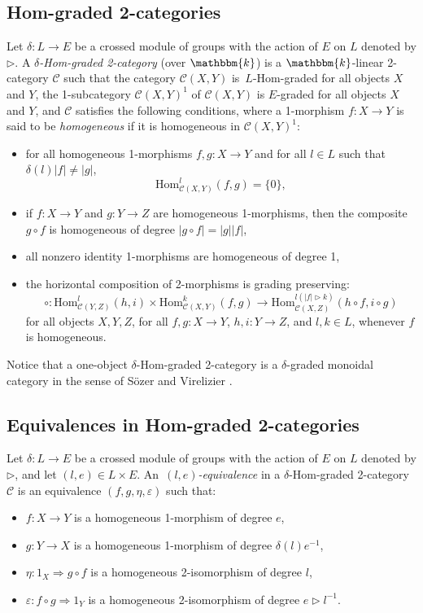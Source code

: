 \documentclass[a4paper, oneside]{amsart}
\numberwithin{equation}{subsection}
\theoremstyle{referencedlemma}
\theoremstyle{plain} %
\theoremstyle{remark}
\begin{document}
\subsection{Hom-graded 2-categories}
Let $\delta \colon L \to E$ be a crossed module of groups with the action of $E$ on $L$ denoted by $\triangleright$.  A \emph{$\delta$-Hom-graded 2-category} (over $\mathbbm{k}$) is a $\mathbbm{k}$-linear 2-category $\mathcal{C}$ such that the category $\mathcal{C}(X,Y)$ is~$L$-Hom-graded for all objects $X$ and $Y$,  the 1-subcategory $\mathcal{C}(X,Y)^1$ of $\mathcal{C}(X,Y)$ is $E$-graded for all objects $X$ and $Y$, and $\mathcal{C}$ satisfies the following conditions, where a 1-morphism $f\colon X\to Y$ is said to be \emph{homogeneous} if it is homogeneous in $\mathcal{C}(X,Y)^1$:
\begin{itemize}
\item for all homogeneous 1-morphisms $f, g\colon X\to Y$ and for all $l\in L$ such that $\delta(l)\lvert f \rvert \neq \lvert g \rvert$,
$$
\mathrm{Hom}_{\mathcal{C}(X,Y)}^l(f,g) = \{0\},
$$
\item  if $f\colon X \to Y$ and $g\colon Y\to Z$ are homogeneous 1-morphisms, then the composite $g\circ f$ is homogeneous of degree $\lvert g\circ f\rvert =  \lvert g \rvert \lvert f\rvert$,
\item all nonzero identity 1-morphisms are homogeneous of degree 1,
\item the horizontal composition of 2-morphisms is grading preserving: $$
    \circ \colon \mathrm{Hom}_{\mathcal{C}(Y,Z)}^l(h,i) \times \mathrm{Hom}_{\mathcal{C}(X,Y)}^k(f,g) \to \mathrm{Hom}_{\mathcal{C}(X,Z)}^{l(\lvert f \rvert \triangleright k)}(h\circ f, i\circ g)
$$
for all objects $X, Y,Z$, for all $f,g\colon X\to Y$, $h,i\colon Y\to Z$, and $l,k\in L$, whenever $f$ is homogeneous.
\end{itemize}

Notice that a one-object $\delta$-Hom-graded 2-category is a $\delta$-graded monoidal category in the sense of Sözer and Virelizier \cite{sozer_monoidal_2023}.

\subsection{Equivalences in Hom-graded 2-categories}

Let $\delta \colon L \to E$ be a crossed module of groups with the action of $E$ on $L$ denoted by $\triangleright$, and let $(l,e) \in L\times E$. An~\emph{$(l,e)$-equivalence} in a $\delta$-Hom-graded 2-category~$\mathcal{C}$ is an equivalence $(f,g,\eta, \varepsilon)$ such that:
\begin{itemize}
\item $f\colon X\to Y$ is a homogeneous 1-morphism of degree $e$,
\item $g\colon Y\to X$ is a homogeneous 1-morphism of degree $\delta(l)e^{-1}$,
\item $\eta\colon 1_X\Rightarrow g\circ f$ is a homogeneous 2-isomorphism of degree $l$,
\item $\varepsilon\colon f\circ g \Rightarrow 1_Y$ is a homogeneous 2-isomorphism of degree $e\triangleright l^{-1}$.
\end{itemize}
\end{document}
